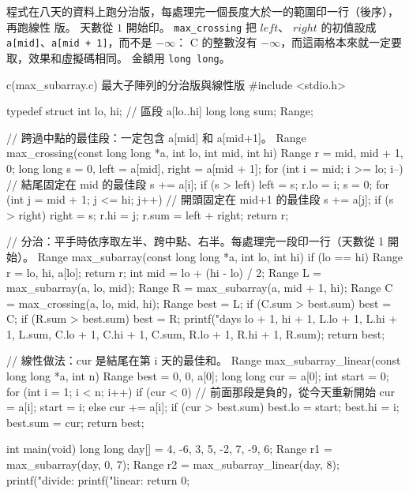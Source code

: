 程式在八天的資料上跑分治版，每處理完一個長度大於一的範圍印一行（後序），再跑線性
版。 天數從 $1$ 開始印。 \texttt{max\_crossing} 把 $\mathit{left}$、
$\mathit{right}$ 的初值設成 \texttt{a[mid]}、\texttt{a[mid + 1]}，而不是 $-\infty$：
C 的整數沒有 $-\infty$，而這兩格本來就一定要取，效果和虛擬碼相同。 金額用
\texttt{long long}。

\begin{example}[label=ex:dc-maxsub]{c}{(max\_subarray.c) 最大子陣列的分治版與線性版}
#include <stdio.h>

typedef struct {
    int lo, hi;                         // 區段 a[lo..hi]
    long long sum;
} Range;

// 跨過中點的最佳段：一定包含 a[mid] 和 a[mid+1]。
Range max_crossing(const long long *a, int lo, int mid, int hi)
{
    Range r = {mid, mid + 1, 0};
    long long s = 0, left = a[mid], right = a[mid + 1];
    for (int i = mid; i >= lo; i--) {   // 結尾固定在 mid 的最佳段
        s += a[i];
        if (s > left) {
            left = s;
            r.lo = i;
        }
    }
    s = 0;
    for (int j = mid + 1; j <= hi; j++) { // 開頭固定在 mid+1 的最佳段
        s += a[j];
        if (s > right) {
            right = s;
            r.hi = j;
        }
    }
    r.sum = left + right;
    return r;
}

// 分治：平手時依序取左半、跨中點、右半。每處理完一段印一行（天數從 1 開始）。
Range max_subarray(const long long *a, int lo, int hi)
{
    if (lo == hi) {
        Range r = {lo, hi, a[lo]};
        return r;
    }
    int mid = lo + (hi - lo) / 2;
    Range L = max_subarray(a, lo, mid);
    Range R = max_subarray(a, mid + 1, hi);
    Range C = max_crossing(a, lo, mid, hi);
    Range best = L;
    if (C.sum > best.sum) {
        best = C;
    }
    if (R.sum > best.sum) {
        best = R;
    }
    printf("days %
           lo + 1, hi + 1, L.lo + 1, L.hi + 1, L.sum, C.lo + 1, C.hi + 1, C.sum,
           R.lo + 1, R.hi + 1, R.sum);
    return best;
}

// 線性做法：cur 是結尾在第 i 天的最佳和。
Range max_subarray_linear(const long long *a, int n)
{
    Range best = {0, 0, a[0]};
    long long cur = a[0];
    int start = 0;
    for (int i = 1; i < n; i++) {
        if (cur < 0) {                  // 前面那段是負的，從今天重新開始
            cur = a[i];
            start = i;
        } else {
            cur += a[i];
        }
        if (cur > best.sum) {
            best.lo = start;
            best.hi = i;
            best.sum = cur;
        }
    }
    return best;
}

int main(void)
{
    long long day[] = {4, -6, 3, 5, -2, 7, -9, 6};
    Range r1 = max_subarray(day, 0, 7);
    Range r2 = max_subarray_linear(day, 8);
    printf("divide: %
    printf("linear: %
    return 0;
}
\end{example}

